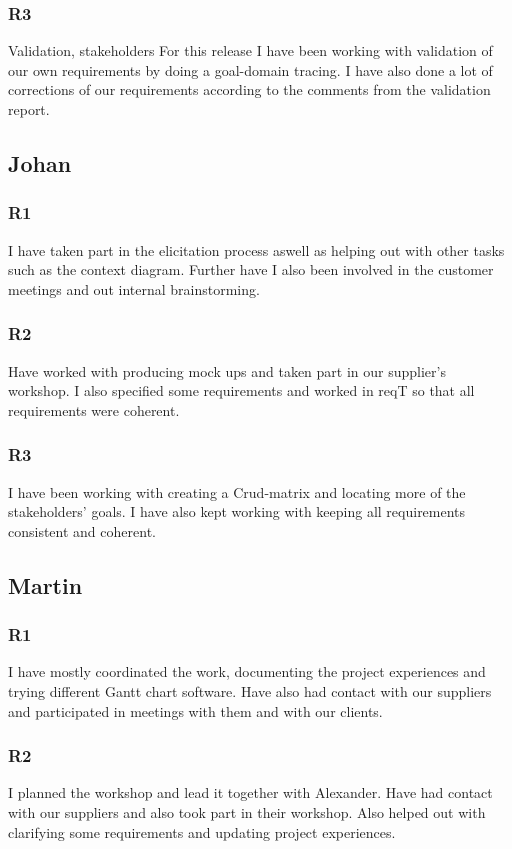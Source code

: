 \documentclass[a4paper]{article}
\begin{document}
		\subsubsection{R3}
		Validation, stakeholders
		For this release I have been working with validation of our own requirements by doing a goal-domain tracing. I have also done a lot of corrections of our requirements according to the comments from the validation report. 
	
	
	\subsection{Johan}
		\subsubsection{R1}
		I have taken part in the elicitation process aswell as helping out with other tasks such as the context diagram. Further have I also been involved in the customer meetings and out internal brainstorming.
		\subsubsection{R2}
		Have worked with producing mock ups and taken part in our supplier's workshop. I also specified some requirements and worked in reqT so that all requirements were coherent.
		\subsubsection{R3}
		I have been working with creating a Crud-matrix and locating more of the stakeholders' goals. I have also kept working with keeping all requirements consistent and coherent.
			
	
	\subsection{Martin}
		\subsubsection{R1}
		I have mostly coordinated the work, documenting the project experiences and trying different Gantt chart software. Have also had contact with our suppliers and participated in meetings with them and with our clients.
		\subsubsection{R2}
		I planned the workshop and lead it together with Alexander. Have had contact with our suppliers and also took part in their workshop. Also helped out with clarifying some requirements and updating project experiences.
\end{document}
